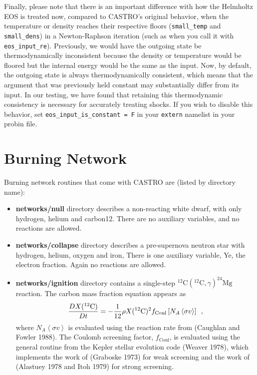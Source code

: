Finally, please note that there is an important difference with how the Helmholtz EOS is treated now, compared to CASTRO's original behavior, when the temperature or density reaches their respective floors (\texttt{small\_temp} and \texttt{small\_dens}) in a Newton-Raphson iteration (such as when you call it with \texttt{eos\_input\_re}). Previously, we would have the outgoing state be thermodynamically inconsistent because the density or temperature would be floored but the internal energy would be the same as the input. Now, by default, the outgoing state is always thermodynamically consistent, which means that the argument that was previously held constant may substantially differ from its input. In our testing, we have found that retaining this thermodynamic consistency is necessary for accurately treating shocks. If you wish to disable this behavior, set \texttt{eos\_input\_is\_constant = F} in your \texttt{extern} namelist in your probin file.

\section{Burning Network}
Burning network routines that come with CASTRO are (listed by directory name):
\begin{itemize}
\item {\bf networks/null} directory describes a non-reacting white dwarf,
with only hydrogen, helium and carbon12.   There are
no auxiliary variables, and no reactions are allowed.
\item {\bf networks/collapse} directory describes a pre-supernova neutron
star with hydrogen, helium, oxygen and iron, There is one auxiliary
variable, Ye, the electron fraction.  Again no reactions are
allowed.
\item {\bf networks/ignition} directory contains a single-step
$^{12}\mathrm{C}(^{12}\mathrm{C},\gamma)^{24}\mathrm{Mg}$ reaction.
The carbon mass fraction equation appears as
\begin{equation}
\frac{D X(^{12}\mathrm{C})}{Dt} = - \frac{1}{12} \rho X(^{12}\mathrm{C})^2
    f_\mathrm{Coul} \left [N_A \left <\sigma v \right > \right]\enskip,
\end{equation}
where $N_A \left <\sigma v\right>$ is evaluated using the reaction
rate from (Caughlan and Fowler 1988).  The Coulomb screening factor,
$f_\mathrm{Coul}$, is evaluated using the general routine from the
Kepler stellar evolution code (Weaver 1978), which implements
the work of (Graboske 1973) for weak screening and the work of
(Alastuey 1978 and Itoh 1979) for strong screening.
\end{itemize}

